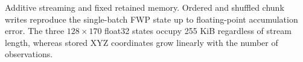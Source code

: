 \caption{Additive streaming and fixed retained memory. Ordered and shuffled chunk writes reproduce the single-batch FWP state up to floating-point accumulation error. The three $128\times170$ float32 states occupy 255 KiB regardless of stream length, whereas stored XYZ coordinates grow linearly with the number of observations.}
\label{fig:additivity_fixed_state}
